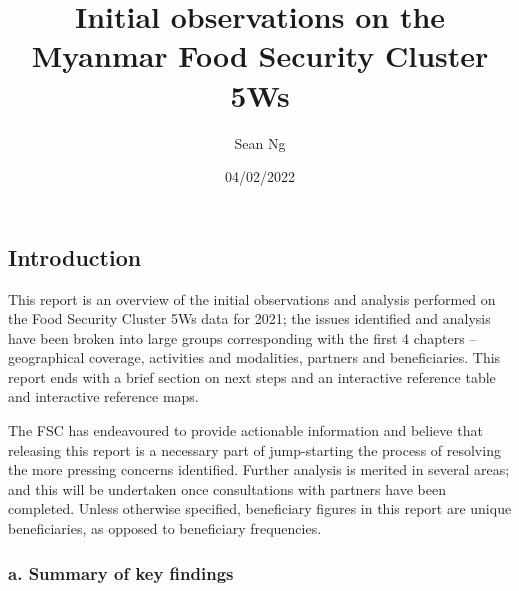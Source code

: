 \documentclass[
]{article}
\title{Initial observations on the Myanmar Food Security Cluster 5Ws}
\author{Sean Ng}
\date{04/02/2022}
\begin{document}
\maketitle

{
\setcounter{tocdepth}{4}
\tableofcontents
}
\hypertarget{introduction}{%
\subsection{Introduction}\label{introduction}}

This report is an overview of the initial observations and analysis
performed on the Food Security Cluster 5Ws data for 2021; the issues
identified and analysis have been broken into large groups corresponding
with the first 4 chapters -- geographical coverage, activities and
modalities, partners and beneficiaries. This report ends with a brief
section on next steps and an interactive reference table and interactive
reference maps.

The FSC has endeavoured to provide actionable information and believe
that releasing this report is a necessary part of jump-starting the
process of resolving the more pressing concerns identified. Further
analysis is merited in several areas; and this will be undertaken once
consultations with partners have been completed. Unless otherwise
specified, beneficiary figures in this report are unique beneficiaries,
as opposed to beneficiary frequencies.

\hypertarget{a.-summary-of-key-findings}{%
\subsubsection{a. Summary of key
findings}\label{a.-summary-of-key-findings}}
\end{document}
